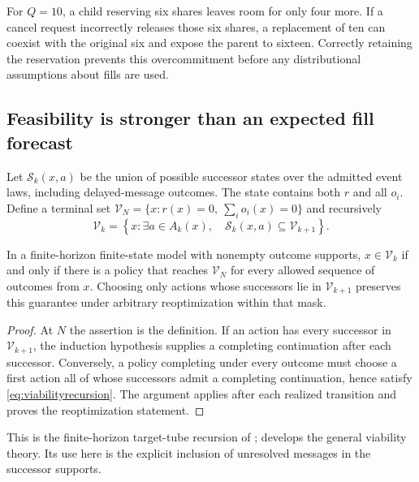 For $Q=10$, a child reserving six shares leaves room for only four more.
If a cancel request incorrectly releases those six shares, a replacement
of ten can coexist with the original six and expose the parent to sixteen.
Correctly retaining the reservation prevents this overcommitment before
any distributional assumptions about fills are used.

\subsection{Feasibility is stronger than an expected fill forecast}

Let $\mathcal S_k(x,a)$ be the union of possible successor states over the
admitted event laws, including delayed-message outcomes. The state contains
both $r$ and all $o_i$. Define a terminal set
$\mathcal V_N=\{x:r(x)=0,\ \sum_i o_i(x)=0\}$ and recursively
\begin{equation}\label{eq:viabilityrecursion}
 \mathcal V_k=\left\{x:\exists a\in A_k(x),\quad
                 \mathcal S_k(x,a)\subseteq\mathcal V_{k+1}\right\}.
\end{equation}

\begin{theorem}
\label{thm:productionviability}
In a finite-horizon finite-state model with nonempty outcome supports,
$x\in\mathcal V_k$ if and only if there is a policy that reaches
$\mathcal V_N$ for every allowed sequence of outcomes from $x$.
Choosing only actions whose successors lie in $\mathcal V_{k+1}$ preserves
this guarantee under arbitrary reoptimization within that mask.
\end{theorem}
\begin{proof}
At $N$ the assertion is the definition. If an action has every successor
in $\mathcal V_{k+1}$, the induction hypothesis supplies a completing
continuation after each successor. Conversely, a policy completing under
every outcome must choose a first action all of whose successors admit a
completing continuation, hence satisfy \eqref{eq:viabilityrecursion}.
The argument applies after each realized transition and proves the
reoptimization statement.
\end{proof}

This is the finite-horizon target-tube recursion of
\citet{BertsekasRhodes1971}; \citet{Aubin1991} develops the general viability
theory. Its use here is the explicit inclusion of unresolved messages in the
successor supports.


